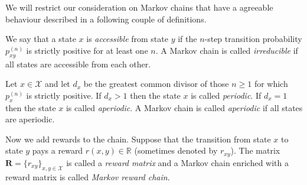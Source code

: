 We will restrict our consideration on Markov chains that have a agreeable behaviour described in a following couple of definitions.
\begin{df}
We say that a state $x$ is {\em accessible} from state $y$ if the $n$-step transition probability $p_{xy}^{(n)}$ is strictly positive for at least one $n$. A Markov chain is called {\em irreducible} if all states are accessible from each other.%
\end{df}
\begin{df}Let $x\in\mathcal{X}$ and let $d_x$ be the greatest common divisor of those $n\geq1$ for which $p_{x}^{(n)}$ is strictly positive. If $d_x>1$ then the state $x$ is called {\em periodic}. If $d_x=1$ then the state $x$ is called {\em aperiodic}. A Markov chain is called {\em aperiodic} if all states are aperiodic.
\end{df}

Now we add rewards to the chain. Suppose that the transition from state $x$ to state $y$ pays a reward $r(x,y)\in\mathbb{R}$ (sometimes denoted by $r_{xy}$). The matrix $\bm{R}=\{r_{xy}\}_{x,y\in\mathcal{X}}$ is called a {\em reward matrix} and a Markov chain enriched with a reward matrix is called {\em Markov reward chain}.

